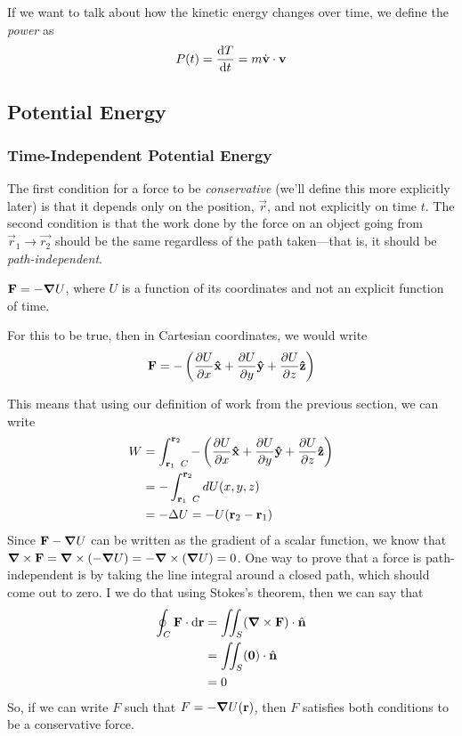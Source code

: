 \documentclass[a4paper]{article}
\begin{document}
    If we want to talk about how the kinetic energy changes over time, we define
    the \emph{power} as
    \[
        P(t) = \frac{\mathrm{d} T}{\mathrm{d} t} = m\dot{\boldsymbol{\mathbf{v}}}\cdot\boldsymbol{\mathbf{v}}
    \]

\subsection{Potential Energy}
\subsubsection{Time-Independent Potential Energy}
The first condition for a force to be \emph{conservative} (we'll define this
more explicitly later) is that it depends only on the position, $\vec{r}$, and
not explicitly on time $t$. The second condition is that the work done by the
force on an object going from $\vec{r}_1 \to \vec{r_2}$ should be the
same regardless of the path taken---that is, it should be
\emph{path-independent}.

\begin{prop}
    $\boldsymbol{\mathbf{F}} = -\boldsymbol{\mathbf{\nabla}} U$, where $U$ is a function of its coordinates and
    not an explicit function of time.
\end{prop}
For this to be true, then in Cartesian coordinates, we would write
\[
    \boldsymbol{\mathbf{F}} = -\left( \frac{\partial U}{\partial x}\boldsymbol{\mathbf{\hat{x}}} + \frac{\partial U}{\partial y}\boldsymbol{\mathbf{\hat{y}}} + \frac{\partial U}{\partial z}\boldsymbol{\mathbf{\hat{z}}} \right)  
\]

This means that using our definition of work from the previous section,
we can write
\begin{align*}
    W &= \int_{\boldsymbol{\mathbf{r}}_1\hspace{1ex}C}^{\boldsymbol{\mathbf{r}}_2}
        -\left( \frac{\partial U}{\partial x}\boldsymbol{\mathbf{\hat{x}}} + \frac{\partial U}{\partial y}\boldsymbol{\mathbf{\hat{y}}} + \frac{\partial U}{\partial z}\boldsymbol{\mathbf{\hat{z}}} \right)\\
    &= -\int_{\boldsymbol{\mathbf{r}}_1\hspace{1ex}C}^{\boldsymbol{\mathbf{r}}_2} dU(x,y,z)\\
    &= -\Delta U = -U(\boldsymbol{\mathbf{r}}_2-\boldsymbol{\mathbf{r}}_1)
\end{align*}
Since $\boldsymbol{\mathbf{F}} -\boldsymbol{\mathbf{\nabla}} U$ can be written as the gradient of a scalar
function, we know that
$\boldsymbol{\mathbf{\nabla}}\times\boldsymbol{\mathbf{F}} = \boldsymbol{\mathbf{\nabla}}\times(-\boldsymbol{\mathbf{\nabla}} U) = -\boldsymbol{\mathbf{\nabla}}\times(\boldsymbol{\mathbf{\nabla}} U) = 0$.
One way to prove that a force is path-independent is by taking the line integral
around a closed path, which should come out to zero. I we do that using
Stokes's theorem, then we can say that
\begin{align*}
    \oint_{C}\boldsymbol{\mathbf{F}}\cdot\mathrm{d}\boldsymbol{\mathbf{r}} &= 
        \iint_{S} (\boldsymbol{\mathbf{\nabla}}\times\boldsymbol{\mathbf{F}})\cdot\hat{\boldsymbol{\mathbf{n}}}\\
    &= \iint_S (\boldsymbol{\mathbf{0}})\cdot\hat{\boldsymbol{\mathbf{n}}}\\
    &= 0
\end{align*}
So, if we can write $F$ such that $F = -\boldsymbol{\mathbf{\nabla}} U(\boldsymbol{\mathbf{r}})$, then $F$ satisfies
both conditions to be a conservative force.
\end{document}

